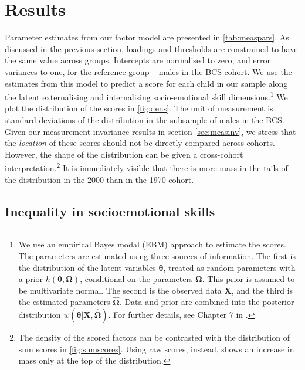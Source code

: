 

\section{Results}\label{sec:results}

Parameter estimates from our factor model are presented in \autoref{tab:measpars}. As discussed in the previous section, loadings and thresholds are constrained to have the same value across groups. Intercepts are normalised to zero, and error variances to one, for the reference group -- males in the BCS cohort. We use the estimates from this model to predict a score for each child in our sample along the latent externalising and internalising socio-emotional skill dimensions.\footnote{We use an empirical Bayes modal (EBM) approach to estimate the scores. The parameters are estimated using three sources of information. The first is the distribution of the latent variables $\bm{\theta}$, treated as random parameters with a prior $h(\bm{\theta}, \bm{\Omega})$, conditional on the parameters $\bm{\Omega}$. This prior is assumed to be multivariate normal. The second is the observed data $\bm{X}$, and the third is the estimated parameters $\hat{\bm{\Omega}}$. Data and prior are combined into the posterior distribution $w(\bm{\theta}| \bm{X}, \hat{\bm{\Omega}})$. For further details, see Chapter 7 in \cite{Skrondal2004}.} We plot the distribution of the scores in \autoref{fig:dens}. The unit of measurement is standard deviations of the distribution in the subsample of males in the BCS. Given our measurement invariance results in section \ref{sec:measinv}, we stress that the \emph{location} of these scores should not be directly compared across cohorts. However, the shape of the distribution can be given a cross-cohort interpretation.\footnote{The density of the scored factors can be contrasted with the distribution of sum scores in \autoref{fig:sumscores}. Using raw scores, instead, shows an increase in mass only at the top of the distribution.} It is immediately visible that there is more mass in the tails of the distribution in the 2000 than in the 1970 cohort.

\subsection{Inequality in socioemotional skills}

